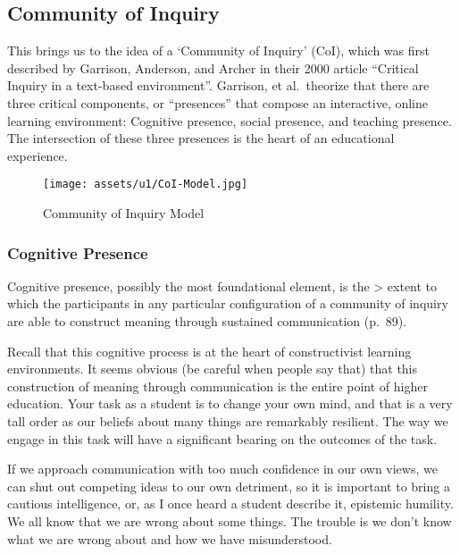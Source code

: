 \documentclass[
]{book}
\begin{document}
\hypertarget{community-of-inquiry}{%
\subsection*{Community of Inquiry}\label{community-of-inquiry}}

This brings us to the idea of a `Community of Inquiry' (CoI), which was first described by Garrison, Anderson, and Archer in their 2000 article ``Critical Inquiry in a text-based environment''. Garrison, et al.~theorize that there are three critical components, or ``presences'' that compose an interactive, online learning environment: Cognitive presence, social presence, and teaching presence. The intersection of these three presences is the heart of an educational experience.

\begin{figure}
\centering
\texttt{[image: assets/u1/CoI-Model.jpg]}
\caption{Community of Inquiry Model}
\end{figure}

\hypertarget{cognitive-presence}{%
\subsubsection*{Cognitive Presence}\label{cognitive-presence}}

Cognitive presence, possibly the most foundational element, is the
\textgreater{} extent to which the participants in any particular configuration of a community of inquiry are able to construct meaning through sustained communication (p.~89).

Recall that this cognitive process is at the heart of constructivist learning environments. It seems obvious (be careful when people say that) that this construction of meaning through communication is the entire point of higher education. Your task as a student is to change your own mind, and that is a very tall order as our beliefs about many things are remarkably resilient. The way we engage in this task will have a significant bearing on the outcomes of the task.

If we approach communication with too much confidence in our own views, we can shut out competing ideas to our own detriment, so it is important to bring a cautious intelligence, or, as I once heard a student describe it, epistemic humility. We all know that we are wrong about some things. The trouble is we don't know what we are wrong about and how we have misunderstood.
\end{document}

